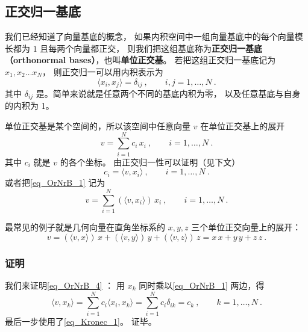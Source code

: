 
\begin{issues}
\issueTODO
\end{issues}



\subsection{正交归一基底}

我们已经知道了向量基底的概念， 如果内积空间中一组向量基底中的每个向量模长都为 $1$ 且每两个向量都正交， 则我们把这组基底称为\textbf{正交归一基底（orthonormal bases）}，也叫\textbf{单位正交基}。 若把这组正交归一基底记为 $x_1, x_2 \dots x_N$， 则正交归一可以用内积表示为
\begin{equation}\label{eq_OrNrB_3}
\langle x_i, x_j \rangle = \delta_{ij} ~,\qquad i,j = 1,\dots, N~.
\end{equation}
其中 $\delta_{ij}$ 是。简单来说就是任意两个不同的基底内积为零， 以及任意基底与自身的内积为 1。

单位正交基是某个空间的，所以该空间中任意向量 $v$ 在单位正交基上的展开
\begin{equation}\label{eq_OrNrB_1}
v = \sum_{i = 1}^N c_i \, x_i ~,\qquad i = 1, \dots, N~.
\end{equation}
其中 $c_i$ 就是 $v$ 的各个坐标。 由正交归一性可以证明（见下文）
\begin{equation}\label{eq_OrNrB_4}
c_i = \langle v, x_i \rangle ~,\qquad i = 1, \dots, N~.
\end{equation}
或者把\autoref{eq_OrNrB_1} 记为
\begin{equation}\label{eq_OrNrB_5}
v = \sum_{i = 1}^N (\langle v, x_i \rangle) \, x_i~, \qquad i = 1, \dots, N~.
\end{equation}

最常见的例子就是几何向量在直角坐标系的 $x, y, z$ 三个单位正交向量上的展开：
\begin{equation}
v = (\langle v, x \rangle)\, x + (\langle v, y \rangle)\, y + (\langle v, z \rangle)\, z = x \, x + y \, y + z \, z~.
\end{equation} 

\subsubsection{证明}
我们来证明\autoref{eq_OrNrB_4} ： 用 $x_k$ 同时乘以\autoref{eq_OrNrB_1} 两边，得
\begin{equation}\label{eq_OrNrB_2}
\langle v, x_k \rangle = \sum_{i = 1}^N c_i \langle x_i, x_k \rangle = \sum_{i = 1}^N c_i \delta_{ik} = c_k ~,\qquad k = 1, \dots, N~.
\end{equation}
最后一步使用了\autoref{eq_Kronec_1}。 证毕。

